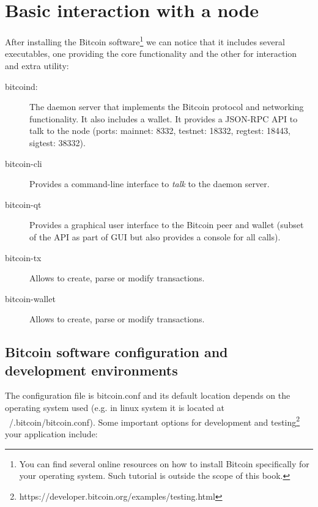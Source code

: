 \section{Basic interaction with a node}
After installing the Bitcoin software\footnote{You can find several online resources on how to install Bitcoin specifically for your operating system. Such tutorial is outside the scope of this book.} we can notice that it includes several executables, one providing the core functionality and the other for interaction and extra utility:
\begin{description}
	\item[bitcoind:] The daemon server that implements the Bitcoin protocol and networking functionality. It also includes a wallet. It provides a JSON-RPC API to talk to the node (ports: mainnet: 8332, testnet: 18332, regtest: 18443, sigtest: 38332).
	\item[bitcoin-cli] Provides a command-line interface to \emph{talk} to the daemon server.
	\item[bitcoin-qt] Provides a graphical user interface to the Bitcoin peer and wallet (subset of the API as part of GUI but also provides a console for all calls).
	\item[bitcoin-tx] Allows to create, parse or modify transactions.
	\item[bitcoin-wallet] Allows to create, parse or modify transactions.
\end{description}

\subsection*{Bitcoin software configuration and development environments}
The configuration file is bitcoin.conf and its default location depends on the operating system used (e.g. in linux system it is located at ~/.bitcoin/bitcoin.conf). Some important options for development and testing\footnote{https://developer.bitcoin.org/examples/testing.html} your application include:

